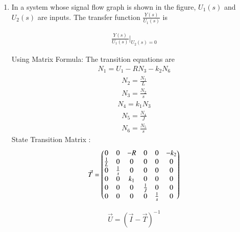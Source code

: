 \begin{enumerate}[label=\thesection.\arabic*.,ref=\thesection.\theenumi]
\item In a system whose signal flow graph is shown in the figure, $U_1(s)$ and $U_2(s)$ are inputs. The transfer function $\frac{Y(s)}{U_1(s)}$ is


\begin{figure}[!ht]
\begin{center}
		
		\resizebox{\columnwidth}{!}{}
	\end{center}
\end{figure}


\solution 
\begin{align}
    \frac{Y(s)}{U_1(s)}\Biggr|_{U_2(s)=0}
\end{align}

Using Matrix Formula:
\newline
The transition equations are
\begin{align}
    N_1 = U_1-RN_3-k_2N_6  
\end{align}
\begin{align}
    N_2=\frac{N_1}{L}
\end{align}
\begin{align}
    N_3=\frac{N_2}{s}
\end{align}
\begin{align}
    N_4=k_1N_3
\end{align}
\begin{align}
    N_5=\frac{N_4}{J}
\end{align}
\begin{align}
    N_6=\frac{N_5}{s}
\end{align}
State Transition Matrix :
\begin{align}
    \Vec{T} = \begin{pmatrix}0 & 0 & -R & 0 & 0 & -k_2\\
    \frac{1}{L} & 0 & 0 & 0 & 0 & 0\\
    0 & \frac{1}{s} & 0 & 0 & 0 & 0\\
    0 & 0 & k_1 & 0 & 0 & 0\\
    0 & 0 & 0 & \frac{1}{J} & 0 & 0\\
    0 & 0 & 0 & 0 & \frac{1}{s} & 0\end{pmatrix}
\end{align}    

\begin{align}
    \Vec{U} = {(\Vec{I}-\Vec{T})^-}^1
\end{align}


\end{enumerate}
